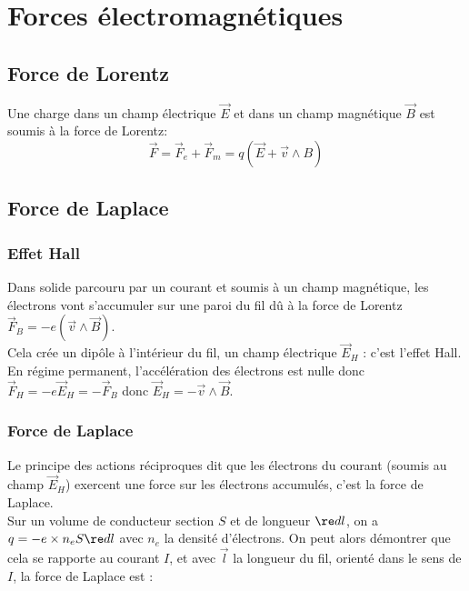 \documentclass[13pt, twoside, a4paper, french]{report}
\begin{document}
\chapter{Forces électromagnétiques}
    
    
    \section{Force de Lorentz}
        
        Une charge dans un champ électrique $\vec E$ et dans un champ magnétique $\vec B$ est soumis à la force de Lorentz:\\
        
        \[\vec F = \vec F_e + \vec F_m = q (\vec E + \vec v \wedge B)\]
    
    
    \section{Force de Laplace}
        
        \subsection{Effet Hall}
            
            Dans solide parcouru par un courant et soumis à un champ magnétique, les électrons vont s'accumuler sur une paroi du fil dû à la force de Lorentz $\vec F_B = -e (\vec v \wedge \vec B)$.\\
            
            Cela crée un dipôle à l'intérieur du fil, un champ électrique $\vec E_H$ : c'est l'effet Hall.\\
            En régime permanent, l'accélération des électrons est nulle donc $\vec F_H = -e \vec E_H = - \vec F_B$ donc $\vec E_H = - \vec v \wedge \vec B$.\\
        
        \subsection{Force de Laplace}
            
            Le principe des actions réciproques dit que les électrons du courant (soumis au champ $\vec E_H$) exercent une force sur les électrons accumulés, c'est la force de Laplace.\\
            
            Sur un volume de conducteur section $S$ et de longueur $\re d l$, on a $q = -e \times n_e S \re d l$ avec $n_e$ la densité d'électrons. On peut alors démontrer que cela se rapporte au courant $I$, et avec $\vec l$ la longueur du fil, orienté dans le sens de $I$, la force de Laplace est :
            
\end{document}
